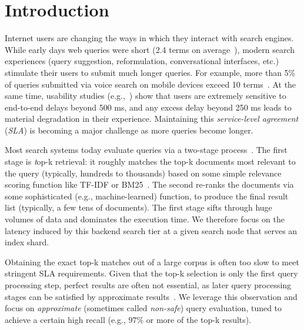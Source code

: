 \section{Introduction}
\label{sec:intro}

Internet users are changing the ways in which they interact with search engines. 
While  early days web queries were short (2.4 terms on average~\cite{Spink:2001:SWP:362968.362979}), 
modern search experiences (query suggestion, reformulation, conversational interfaces, etc.) stimulate their users to submit much longer queries. 
For example, more than 5\% of queries submitted via voice search on mobile devices exceed 10 terms~\cite{sigir/Guy16}. 
At the same time, usability studies
(e.g.,~\cite{Arapakis:2014:IRL:2600428.2609627}) show that users are extremely sensitive to end-to-end delays beyond 500 ms, 
and any excess delay beyond 250 ms leads to material degradation in their experience. Maintaining this \emph{service-level agreement} ({\em SLA}) 
is becoming a major challenge as more queries become longer.

 Most search systems today evaluate queries via a two-stage process~\cite{Wang:2011}. 
The first stage is {\emph top-k retrieval}: it 
 roughly matches the top-k documents most relevant to the query (typically, hundreds to thousands) based on some simple relevance scoring function like TF-IDF or BM25~\cite{Baeza-Yates:1999:MIR:553876}. The second  re-ranks the  documents via some sophisticated (e.g., machine-learned) function, to produce the final result list (typically, a few tens of documents). 
The first stage  sifts through huge volumes of data and dominates the execution time. 
We therefore focus on the latency induced by this backend search tier at a given search node that serves an index shard.

Obtaining the exact top-k matches out of a large corpus is often too slow to meet stringent SLA requirements. 
Given that the top-k selection is only the first query  processing step, perfect results are often not essential, as later query processing 
stages can be satisfied by approximate results~\cite{Lin:2015}. We leverage this observation and focus on \emph{approximate} 
(sometimes called \emph{non-safe}) query evaluation, tuned to achieve a certain high recall (e.g., $97\%$ or more of the top-k results). 

